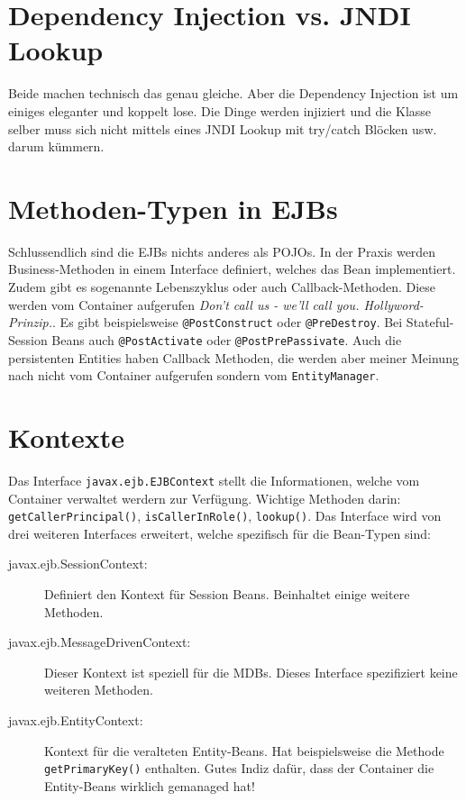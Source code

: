 \section{Dependency Injection vs. JNDI Lookup}
Beide machen technisch das genau gleiche. Aber die Dependency Injection ist um einiges eleganter und koppelt lose. Die Dinge werden injiziert und die Klasse selber muss sich nicht mittels eines JNDI Lookup mit try/catch Blöcken usw. darum kümmern.

\section{Methoden-Typen in EJBs}
Schlussendlich sind die EJBs nichts anderes als POJOs. In der Praxis werden Business-Methoden in einem Interface definiert, welches das Bean implementiert. Zudem gibt es sogenannte Lebenszyklus oder auch Callback-Methoden. Diese werden vom Container aufgerufen \emph{Don't call us - we'll call you. Hollyword-Prinzip.}. Es gibt beispielsweise \verb|@PostConstruct| oder \verb|@PreDestroy|. Bei Stateful-Session Beans auch \verb|@PostActivate| oder \verb|@PostPrePassivate|. Auch die persistenten Entities haben Callback Methoden, die werden aber meiner Meinung nach nicht vom Container aufgerufen sondern vom \verb|EntityManager|.

\section{Kontexte}
Das Interface \verb|javax.ejb.EJBContext| stellt die Informationen, welche vom Container verwaltet werdern zur Verfügung. Wichtige Methoden darin: \verb|getCallerPrincipal()|, \verb|isCallerInRole()|, \verb|lookup()|. Das Interface wird von drei weiteren Interfaces erweitert, welche spezifisch für die Bean-Typen sind:
\begin{description}
	\item[javax.ejb.SessionContext:] Definiert den Kontext für Session Beans. Beinhaltet einige weitere Methoden.
	
	\item[javax.ejb.MessageDrivenContext:] Dieser Kontext ist speziell für die MDBs. Dieses Interface spezifiziert keine weiteren Methoden.
	
	\item[javax.ejb.EntityContext:] Kontext für die veralteten Entity-Beans. Hat beispielsweise die Methode \verb|getPrimaryKey()| enthalten. Gutes Indiz dafür, dass der Container die Entity-Beans wirklich gemanaged hat!
\end{description}

